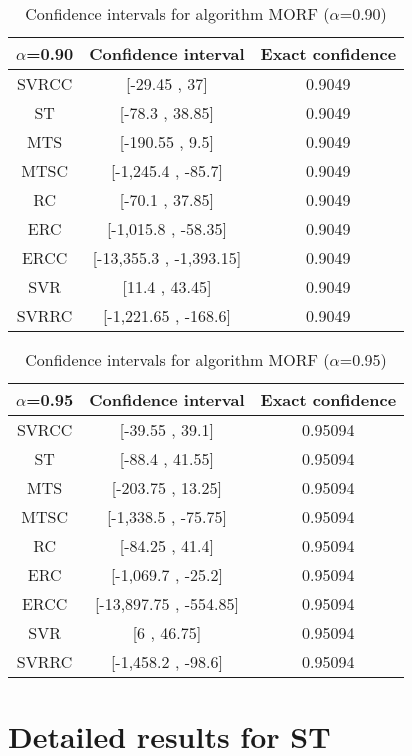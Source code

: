 \documentclass[a4paper,10pt]{article}
\begin{document}
\begin{table}[!htp]
\centering\small
\begin{tabular}{
|c|c|c|}
\hline
 $\alpha$=0.90 & Confidence interval & Exact confidence \\ \hline 
SVRCC & [-29.45 , 37] & 0.9049\\ \hline 
ST & [-78.3 , 38.85] & 0.9049\\ \hline 
MTS & [-190.55 , 9.5] & 0.9049\\ \hline 
MTSC & [-1,245.4 , -85.7] & 0.9049\\ \hline 
RC & [-70.1 , 37.85] & 0.9049\\ \hline 
ERC & [-1,015.8 , -58.35] & 0.9049\\ \hline 
ERCC & [-13,355.3 , -1,393.15] & 0.9049\\ \hline 
SVR & [11.4 , 43.45] & 0.9049\\ \hline 
SVRRC & [-1,221.65 , -168.6] & 0.9049\\ \hline 

\end{tabular}
\caption{Confidence intervals for algorithm MORF ($\alpha$=0.90)}
\end{table}
\begin{table}[!htp]
\centering\small
\begin{tabular}{
|c|c|c|}
\hline
 $\alpha$=0.95 & Confidence interval & Exact confidence \\ \hline 
SVRCC & [-39.55 , 39.1] & 0.95094\\ \hline 
ST & [-88.4 , 41.55] & 0.95094\\ \hline 
MTS & [-203.75 , 13.25] & 0.95094\\ \hline 
MTSC & [-1,338.5 , -75.75] & 0.95094\\ \hline 
RC & [-84.25 , 41.4] & 0.95094\\ \hline 
ERC & [-1,069.7 , -25.2] & 0.95094\\ \hline 
ERCC & [-13,897.75 , -554.85] & 0.95094\\ \hline 
SVR & [6 , 46.75] & 0.95094\\ \hline 
SVRRC & [-1,458.2 , -98.6] & 0.95094\\ \hline 

\end{tabular}
\caption{Confidence intervals for algorithm MORF ($\alpha$=0.95)}
\end{table}

 \clearpage 


\section{Detailed results for ST}
\end{document}
